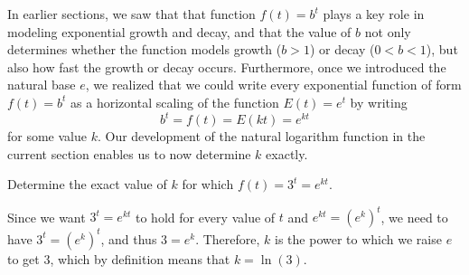 \documentclass[nooutcomes]{ximera}
\begin{document}
In earlier sections, we saw that that function \(f(t) = b^t\) plays a key role in modeling exponential growth and decay, and that the value of \(b\) not only determines whether the function models growth (\(b \gt 1\)) or decay (\(0 \lt b \lt 1\)), but also how fast the growth or decay occurs.  Furthermore, once we introduced the natural base \(e\), we realized that we could write every exponential function of form \(f(t) = b^t\) as a horizontal scaling of the function \(E(t) = e^t\) by writing%
\begin{equation*}
b^t = f(t) = E(kt) = e^{kt}
\end{equation*}
for some value \(k\).  Our development of the natural logarithm function in the current section enables us to now determine \(k\) exactly.%
\begin{example}

Determine the exact value of \(k\) for which \(f(t) = 3^t = e^{kt}\).%

\begin{explanation} Since we want \(3^t = e^{kt}\) to hold for every value of \(t\) and \(e^{kt} = (e^k)^t\), we need to have \(3^t = (e^k)^t\), and thus \(3 = e^k\).  Therefore, \(k\) is the power to which we raise \(e\) to get \(3\), which by definition means that \(k = \ln(3)\).%
\end{explanation}
\end{example}
\end{document}

